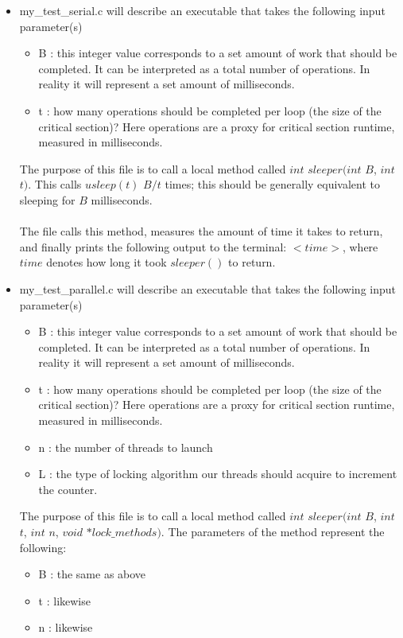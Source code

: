\documentclass[]{article}
\begin{document}
\begin{itemize}
\begin{itemize}
		\item my\_test\_serial.c will describe an executable that takes the following input parameter(s)
		\begin{itemize}
			\item B : this integer value corresponds to a set amount of work that should be completed. It can be interpreted as a total number of operations. In reality it will represent a set amount of milliseconds.
			\item t : how many operations should be completed per loop (the size of the critical section)? Here operations are a proxy for critical section runtime, measured in milliseconds.
		\end{itemize}
		The purpose of this file is to call a local method called $int$  $sleeper(int$ $B$, $int$ $t)$. This calls $usleep(t)$ $B / t$ times; this should be generally equivalent to sleeping for $B$ milliseconds.
		\\\\
		The file calls this method, measures the amount of time it takes to return, and finally prints the following output to the terminal: $<time>$, where  $time$ denotes how long it took $sleeper()$ to return.
		\item my\_test\_parallel.c will describe an executable that takes the following input parameter(s)
		\begin{itemize}
			\item B : this integer value corresponds to a set amount of work that should be completed. It can be interpreted as a total number of operations. In reality it will represent a set amount of milliseconds.
			\item t : how many operations should be completed per loop (the size of the critical section)? Here operations are a proxy for critical section runtime, measured in milliseconds.
			\item n : the number of threads to launch
			\item L : the type of locking algorithm our threads should acquire to increment the counter.
		\end{itemize}
		The purpose of this file is to call a local method called $int$  $sleeper(int$ $B$, $int$ $t$, $int$ $n$, $void$ $*lock\_methods)$. The parameters of the method represent the following:
		\begin{itemize}
			\item B : the same as above
			\item t : likewise
			\item n : likewise

\end{itemize}
\end{itemize}
\end{itemize}
\end{document}

